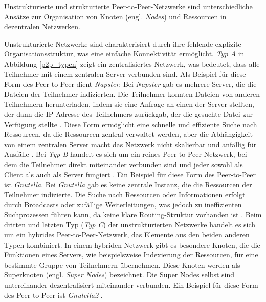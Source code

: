 \noindent Unstrukturierte und strukturierte Peer-to-Peer-Netzwerke sind unterschiedliche Ansätze zur Organisation von Knoten (engl. \textit{Nodes}) und Ressourcen in dezentralen Netzwerken.

Unstrukturierte Netzwerke sind charakterisiert durch ihre fehlende explizite Organisationsstruktur, was eine einfache Konnektivität ermöglicht. \textit{Typ A} in Abbildung \ref{p2p_typen} zeigt ein zentralisiertes Netzwerk, was bedeutet, dass alle Teilnehmer mit einem zentralen Server verbunden sind. Als Beispiel für diese Form des Peer-to-Peer dient \textit{Napster}. Bei \textit{Napster} gab es mehrere Server, die die Dateien der Teilnehmer indizierten. Die Teilnehmer konnten Dateien von anderen Teilnehmern herunterladen, indem sie eine Anfrage an einen der Server stellten, der dann die IP-Adresse des Teilnehmers zurückgab, der die gesuchte Datei zur Verfügung stellte \parencite[S. 171]{Saroiu_MeasuringAndAnalyzingNapsterAndGnutellaHosts}. Diese Form ermöglicht eine schnelle und effiziente Suche nach Ressourcen, da die Ressourcen zentral verwaltet werden, aber die Abhängigkeit von einem zentralen Server macht das Netzwerk nicht skalierbar und anfällig für Ausfälle \parencite[S. 732]{Khatibi_StructuredUnstructuredP2P}.
Bei \textit{Typ B} handelt es sich um ein reines Peer-to-Peer-Netzwerk, bei dem die Teilnehmer direkt miteinander verbunden sind und jeder sowohl als Client als auch als Server fungiert \parencite[S. 732]{Khatibi_StructuredUnstructuredP2P}. Ein Beispiel für diese Form des Peer-to-Peer ist \textit{Gnutella}. Bei \textit{Gnutella} gab es keine zentrale Instanz, die die Ressourcen der Teilnehmer indizierte. Die Suche nach Ressourcen oder Informationen erfolgt durch Broadcasts oder zufällige Weiterleitungen, was jedoch zu ineffizienten Suchprozessen führen kann, da keine klare Routing-Struktur vorhanden ist \parencite[S. 171]{Saroiu_MeasuringAndAnalyzingNapsterAndGnutellaHosts}. Beim dritten und letzten Typ (\textit{Typ C}) der unstrukturierten Netzwerke handelt es sich um ein hybrides Peer-to-Peer-Netzwerk, das Elemente aus den beiden anderen Typen kombiniert. In einem hybriden Netzwerk gibt es besondere Knoten, die die Funktionen eines Servers, wie beispielsweise Indexierung der Ressourcen, für eine bestimmte Gruppe von Teilnehmern übernehmen. Diese Knoten werden als Superknoten (engl. \textit{Super Nodes}) bezeichnet. Die Super Nodes selbst sind untereinander dezentralisiert miteinander verbunden. Ein Beispiel für diese Form des Peer-to-Peer ist \textit{Gnutella2} \parencite[S. 732]{Khatibi_StructuredUnstructuredP2P}. 

